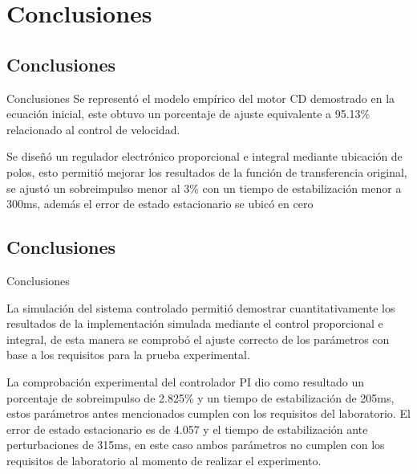 \documentclass[mathserif,spanish]{beamer}
\begin{document}
\section{Conclusiones}              %
    \subsection{Conclusiones}       %
        \begin{frame}{Conclusiones}
            Se representó el modelo empírico del motor CD demostrado en la ecuación inicial, este obtuvo un porcentaje de ajuste equivalente a 95.13\% relacionado al control de velocidad.

\newline

Se diseñó un regulador electrónico proporcional e integral mediante ubicación de polos, esto permitió mejorar los resultados de la función de transferencia original, se ajustó un sobreimpulso menor al 3\% con un tiempo de estabilización menor a 300ms, además el error de estado estacionario se ubicó en cero
        \end{frame}
    \subsection{Conclusiones}       %
        \begin{frame}{Conclusiones}
        
        La simulación del sistema controlado permitió demostrar cuantitativamente los resultados de la implementación simulada mediante el control proporcional e integral, de esta manera se comprobó el ajuste correcto de los parámetros con base a los requisitos para la prueba experimental.

La comprobación experimental del controlador PI dio como resultado un porcentaje de sobreimpulso de 2.825\% y un tiempo de estabilización de 205ms, estos parámetros antes mencionados cumplen con los requisitos del laboratorio. El error de estado estacionario es de 4.057 y el tiempo de estabilización ante perturbaciones de 315ms, en este caso ambos parámetros no cumplen con los requisitos de laboratorio al momento de realizar el experimento.
\end{frame}
\end{document}
